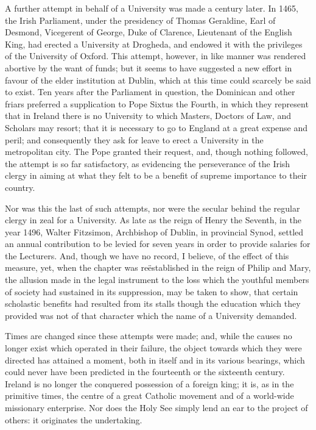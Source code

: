 A further attempt in behalf of
a University was made a century later. In 1465, the Irish Parliament,
under the presidency of Thomas Geraldine, Earl of Desmond, Vicegerent
of George, Duke of Clarence, Lieutenant of the English King, had
erected a University at Drogheda, and endowed it with the privileges
of the University of Oxford. This attempt, however, in like manner was
rendered abortive by the want of funds; but it seems to have suggested
a new effort in favour of the elder institution at Dublin, which at
this time could scarcely be said to exist. Ten years after the
Parliament in question, the Dominican and other friars preferred a
supplication to Pope Sixtus the Fourth, in which they represent that
in Ireland there is no University to which Masters, Doctors of Law,
and Scholars may resort; that it is necessary to go to England at a
great expense and peril; and consequently they ask for leave to erect
a University in the metropolitan city. The Pope granted their request,
and, though nothing followed, the attempt is so far satisfactory, as
evidencing the perseverance of the Irish clergy in aiming at what they
felt to be a benefit of supreme importance to their country.

Nor was this the last of such
attempts, nor were the secular behind the regular clergy in zeal
for a University. As late as the reign of Henry the Seventh, in the
year 1496, Walter Fitzsimon, Archbishop of Dublin, in provincial
Synod, settled an annual contribution to be levied for seven years in
order to provide salaries for the Lecturers. And, though we have no
record, I believe, of the effect of this measure, yet, when the
chapter was reëstablished in the reign of Philip and Mary, the
allusion made in the legal instrument to the loss which the youthful
members of society had sustained in its suppression, may be taken to
show, that certain scholastic benefits had resulted from its stalls
though the education which they provided was not of that character
which the name of a University demanded.

Times are changed since these
attempts were made; and, while the causes no longer exist which
operated in their failure, the object towards which they were directed
has attained a moment, both in itself and in its various bearings,
which could never have been predicted in the fourteenth or the
sixteenth century. Ireland is no longer the conquered possession of a
foreign king; it is, as in the primitive times, the centre of a great
Catholic movement and of a world-wide missionary enterprise. Nor does
the Holy See simply lend an ear to the project of others: it
originates the undertaking.

